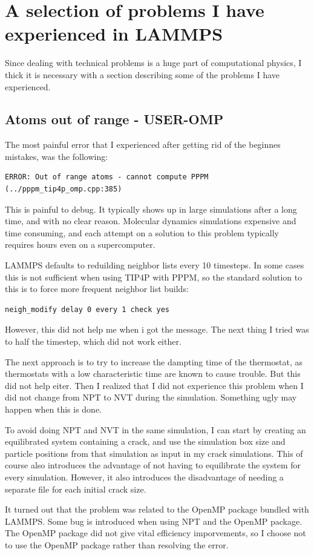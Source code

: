 \section{A selection of problems I have experienced in LAMMPS}

Since dealing with technical problems is a huge part of computational physics, I thick it is necessary with a section describing some of the problems I have experienced.

\subsection{Atoms out of range - USER-OMP}
The most painful error that I experienced after getting rid of the beginnes mistakes, was the following:


\begin{verbatim}
ERROR: Out of range atoms - cannot compute PPPM (../pppm_tip4p_omp.cpp:385)
\end{verbatim}

This is painful to debug. It typically shows up in large simulations after a long time, and with no clear reason. Molecular dynamics simulations expensive and time consuming, and each attempt on a solution to this problem typically requires hours even on a supercomputer. 

LAMMPS defaults to reduilding neighbor lists every 10 timesteps. In some cases this is not sufficient when using TIP4P with PPPM, so the standard solution to this is to force more frequent neighbor list builds:

\begin{lstlisting}[language=LammpsInput]
neigh_modify delay 0 every 1 check yes
\end{lstlisting}

However, this did not help me when i got the message. The next thing I tried was to half the timestep, which did not work either.

The next approach is to try to increase the dampting time of the thermostat, as thermostats with a low characteristic time are known to cause trouble. But this did not help eiter. Then I realized that I did not experience this problem when I did not change from NPT to NVT during the simulation. Something ugly may happen when this is done.

To avoid doing NPT and NVT in the same simulation, I can start by creating an equilibrated system containing a crack, and use the simulation box size and particle positions from that simulation as input in my crack simulations. This of course also introduces the advantage of not having to equilibrate the system for every simulation. However, it also introduces the disadvantage of needing a separate file for each initial crack size.

It turned out that the problem was related to the OpenMP package bundled with LAMMPS. Some bug is introduced when using NPT and the OpenMP package. The OpenMP package did not give vital efficiency imporvements, so I choose not to use the OpenMP package rather than resolving the error.
